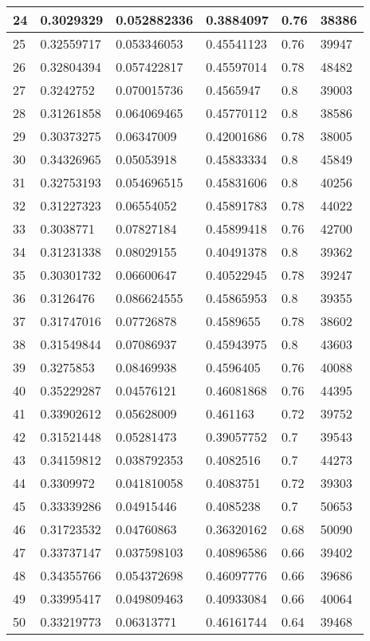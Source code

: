 \begin{longtable}{|l|l|l|l|l|l|}
24 & 0.3029329 & 0.052882336 & 0.3884097 & 0.76 & 38386 \\ \hline 
25 & 0.32559717 & 0.053346053 & 0.45541123 & 0.76 & 39947 \\ \hline 
26 & 0.32804394 & 0.057422817 & 0.45597014 & 0.78 & 48482 \\ \hline 
27 & 0.3242752 & 0.070015736 & 0.4565947 & 0.8 & 39003 \\ \hline 
28 & 0.31261858 & 0.064069465 & 0.45770112 & 0.8 & 38586 \\ \hline 
29 & 0.30373275 & 0.06347009 & 0.42001686 & 0.78 & 38005 \\ \hline 
30 & 0.34326965 & 0.05053918 & 0.45833334 & 0.8 & 45849 \\ \hline 
31 & 0.32753193 & 0.054696515 & 0.45831606 & 0.8 & 40256 \\ \hline 
32 & 0.31227323 & 0.06554052 & 0.45891783 & 0.78 & 44022 \\ \hline 
33 & 0.3038771 & 0.07827184 & 0.45899418 & 0.76 & 42700 \\ \hline 
34 & 0.31231338 & 0.08029155 & 0.40491378 & 0.8 & 39362 \\ \hline 
35 & 0.30301732 & 0.06600647 & 0.40522945 & 0.78 & 39247 \\ \hline 
36 & 0.3126476 & 0.086624555 & 0.45865953 & 0.8 & 39355 \\ \hline 
37 & 0.31747016 & 0.07726878 & 0.4589655 & 0.78 & 38602 \\ \hline 
38 & 0.31549844 & 0.07086937 & 0.45943975 & 0.8 & 43603 \\ \hline 
39 & 0.3275853 & 0.08469938 & 0.4596405 & 0.76 & 40088 \\ \hline 
40 & 0.35229287 & 0.04576121 & 0.46081868 & 0.76 & 44395 \\ \hline 
41 & 0.33902612 & 0.05628009 & 0.461163 & 0.72 & 39752 \\ \hline 
42 & 0.31521448 & 0.05281473 & 0.39057752 & 0.7 & 39543 \\ \hline 
43 & 0.34159812 & 0.038792353 & 0.4082516 & 0.7 & 44273 \\ \hline 
44 & 0.3309972 & 0.041810058 & 0.4083751 & 0.72 & 39303 \\ \hline 
45 & 0.33339286 & 0.04915446 & 0.4085238 & 0.7 & 50653 \\ \hline 
46 & 0.31723532 & 0.04760863 & 0.36320162 & 0.68 & 50090 \\ \hline 
47 & 0.33737147 & 0.037598103 & 0.40896586 & 0.66 & 39402 \\ \hline 
48 & 0.34355766 & 0.054372698 & 0.46097776 & 0.66 & 39686 \\ \hline 
49 & 0.33995417 & 0.049809463 & 0.40933084 & 0.66 & 40064 \\ \hline 
50 & 0.33219773 & 0.06313771 & 0.46161744 & 0.64 & 39468 \\ \hline 
\end{longtable}